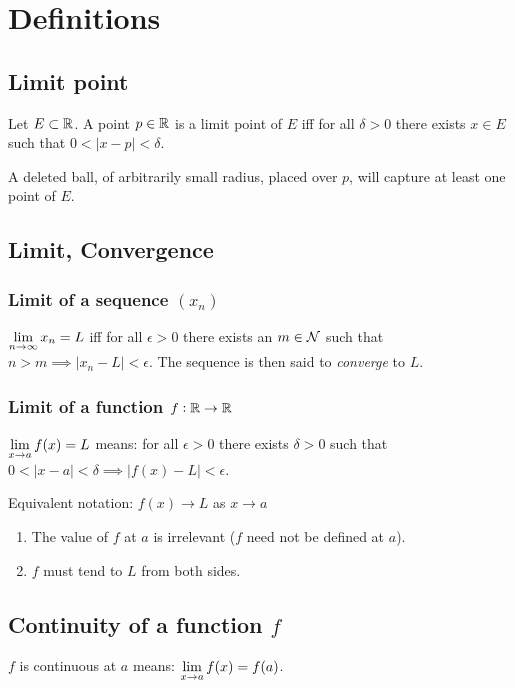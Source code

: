 \section{Definitions}

\subsection{Limit point}
Let $E \subset \R$. A point $p \in \R$ is a limit point of $E$ iff for all $\delta > 0$ there
exists $x \in E$ such that $0 < |x - p| < \delta$.

\begin{intuition*}
  A deleted ball, of arbitrarily small radius, placed over $p$, will capture at least one point of
  $E$.
\end{intuition*}

\subsection{Limit, Convergence}

\subsubsection{Limit of a sequence $(x_n)$}
$\LimEq{x_n}{L}{n}{\infty}$ iff for all $\epsilon > 0$ there exists an $m \in \N$ such that
$n > m \implies |x_n - L| < \epsilon$. The sequence is then said to \textit{converge} to $L$.

\subsubsection{Limit of a function $f:\R\to\R$}

$\LimEq{f(x)}{L}{x}{a}$ means: for all $\epsilon > 0$ there exists $\delta > 0$ such that
$0 < |x - a| < \delta \implies |f(x) - L| < \epsilon$.

Equivalent notation: $f(x) \to L$ as $x \to a$

\begin{remark*}\hspace{0pt}
  \begin{enumerate}
  \item The value of $f$ at $a$ is irrelevant ($f$ need not be defined at $a$).
  \item $f$ must tend to $L$ from both sides.
  \end{enumerate}
\end{remark*}

\subsection{Continuity of a function $f$}
$f$ is continuous at $a$ means: $\LimEq{f(x)}{f(a)}{x}{a}$.

